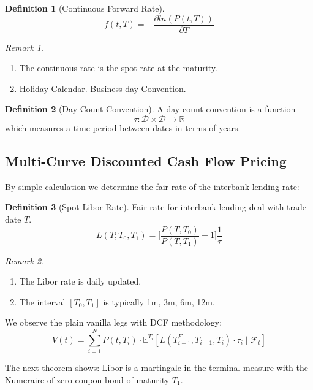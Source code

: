 \documentclass[a4paper,11pt]{book}
\theoremstyle{definition}
\newtheorem{definition}{Definition}[section]
\theoremstyle{remark}
\newtheorem*{remark}{Remark}
\begin{document}
\begin{definition}[Continuous Forward Rate]
\begin{equation*}
	f(t, T) = -\frac{\partial ln(P(t, T))}{\partial T}
\end{equation*}
\end{definition}
\begin{remark}
\quad
\begin{enumerate}
	\item The continuous rate is the spot rate at the maturity. 
	\item Holiday Calendar. Business day Convention.
\end{enumerate}
\end{remark}

\begin{definition}[Day Count Convention]
A day count convention is a function 
\[
\tau : \mathcal{D} \times \mathcal{D} \to \mathbb{R}
\]
which measures a time period between dates in terms of years.
\end{definition}


\subsection{Multi-Curve Discounted Cash Flow Pricing}
By simple calculation we determine the fair rate of the interbank lending rate:
\begin{definition}[Spot Libor Rate]
Fair rate for interbank lending deal with trade date $T$.
\begin{equation*}
	L(T;T_0, T_1) = \bigg[\frac{P(T, T_0)}{P(T, T_1)} - 1\bigg] \frac{1}{\tau}
\end{equation*}
\end{definition}
\begin{remark}
\quad
\begin{enumerate}
	\item The Libor rate is daily updated.
	\item The interval $[T_0, T_1]$ is typically 1m, 3m, 6m, 12m. 
\end{enumerate}	
\end{remark}

We observe the plain vanilla legs with DCF methodology: 
\[
V(t) = \sum_{i=1}^{N} P(t, T_i) \cdot \mathbb{E}^{T_i} \left[ L(T_{i-1}^F, T_{i-1}, T_i) \cdot \tau_i \mid \mathcal{F}_t \right]
\]



The next theorem shows: Libor is a martingale in the terminal measure with the Numeraire of zero coupon bond of maturity $T_1$.
\end{document}
